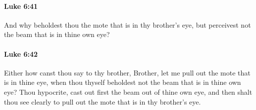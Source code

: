 		\paragraph{Luke 6:41} %
			\label{LUKE-6-41}

			And why beholdest thou the mote that is in thy brother's eye, but perceivest not the beam that is in thine own eye?

			\begin{framed}
			\scriptsize
				\begin{compactdesc}
					\item[SBLG] 
				\end{compactdesc}
			\end{framed}

		\paragraph{Luke 6:42} %
			\label{LUKE-6-42}

			Either how canst thou say to thy brother, Brother, let me pull out the mote that is in thine eye, when thou thyself beholdest not the beam that is in thine own eye? Thou hypocrite, cast out first the beam out of thine own eye, and then shalt thou see clearly to pull out the mote that is in thy brother's eye.

